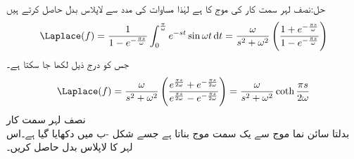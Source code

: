 حل:نصف لہر سمت کار کی موج کا  ہے لہٰذا مساوات  کی مدد سے لاپلاس بدل حاصل کرتے ہیں
\begin{align}
\Laplace(f)=\frac{1}{1-e^{-\frac{\pi s}{\omega}}}\int_{0}^{\frac{\pi}{\omega}} e^{-st}\sin \omega t\dif t=\frac{\omega}{s^2+\omega^2} \left(\frac{1+e^{-\frac{\pi s}{\omega}}}{1-e^{-\frac{\pi s}{\omega}}}\right)
\end{align}
جس کو درج ذیل لکھا جا سکتا ہے۔
\begin{align*}
\Laplace(f)=\frac{\omega}{s^2+\omega^2} \left(\frac{e^{\frac{\pi s}{2\omega}}+e^{-\frac{\pi s}{2\omega}}}{e^{\frac{\pi s}{2\omega}}-e^{-\frac{\pi s}{2\omega}}}\right)=\frac{\omega}{s^2+\omega^2}\coth \frac{\pi s}{2\omega}
\end{align*}
\quad نصف لہر سمت کار\\
 بدلتا سائن نما موج سے یک سمت موج بناتا ہے جسے شکل -ب میں دکھایا گیا ہے۔اس لہر کا لاپلاس بدل حاصل کریں۔


